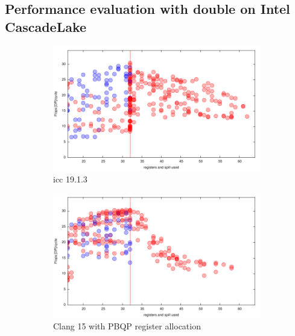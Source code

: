 \documentclass[sigconf,review]{acmart}
\begin{document}
\subsection{Performance evaluation with double on Intel CascadeLake}
\begin{figure}[ht]
  \begin{subfigure}[h]{0.45\textwidth}  
\includegraphics[width=\textwidth]{../benches/gemm/cascadelake-64x256x64/icc-19.1.3.pdf}
  \caption{icc 19.1.3}
  \end{subfigure}
  \begin{subfigure}[h]{0.45\textwidth}  
\includegraphics[width=\textwidth]{../benches/gemm/cascadelake-64x256x64/pbqp.pdf}
  \caption{Clang 15 with PBQP register allocation}
  \end{subfigure}
  \begin{subfigure}[h]{0.45\textwidth}  

\end{subfigure}
\end{figure}
\end{document}
